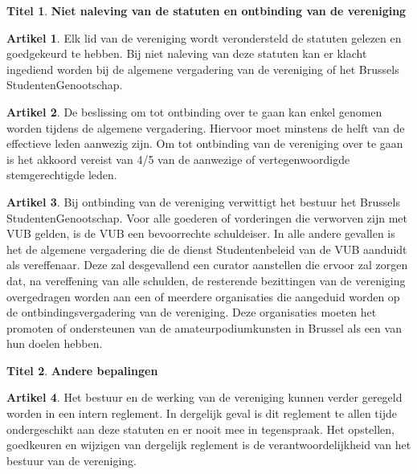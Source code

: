 \documentclass[a4paper,10pt]{article}
\theoremstyle{definition}
\newtheorem{titel}{\newline\Large Titel}
\newtheorem{artikelbase}{\large Artikel}
\newenvironment{artikel}
  {\begin{artikelbase}}
  {\smallskip
   \end{artikelbase}}
\newcommand{\ttext}[1]{\Large \textbf{#1} \normalsize}
\newcommand{\ttextcr}{\hfill\newline}
\begin{document}
\begin{titel}\ttext{Niet naleving van de statuten en ontbinding van de vereniging}

  \begin{artikel}\ttextcr
    Elk lid van de vereniging wordt verondersteld de statuten gelezen en goedgekeurd te hebben.
    Bij niet naleving van deze statuten kan er klacht ingediend worden bij de algemene vergadering van de vereniging of het Brussels StudentenGenootschap.
  \end{artikel}

  \begin{artikel}\label{ontbinding}\ttextcr
    De beslissing om tot ontbinding over te gaan kan enkel genomen worden tijdens de algemene vergadering.
    Hiervoor moet minstens de helft van de effectieve leden aanwezig zijn.
    Om tot ontbinding van de vereniging over te gaan is het akkoord vereist van 4/5 van de aanwezige of vertegenwoordigde stemgerechtigde leden.
  \end{artikel}

  \begin{artikel}\ttextcr
    Bij ontbinding van de vereniging verwittigt het bestuur het Brussels StudentenGenootschap.
    Voor alle goederen of vorderingen die verworven zijn met VUB gelden, is de VUB een bevoorrechte schuldeiser.
    In alle andere gevallen is het de algemene vergadering die de dienst Studentenbeleid van de VUB aanduidt als vereffenaar.
    Deze zal desgevallend een curator aanstellen die ervoor zal zorgen dat, na vereffening van alle schulden, de resterende bezittingen van de vereniging overgedragen worden aan een of meerdere organisaties die aangeduid worden op de ontbindingsvergadering van de vereniging.
    Deze organisaties moeten het promoten of ondersteunen van de amateurpodiumkunsten in Brussel als een van hun doelen hebben.
  \end{artikel}

\end{titel}


\begin{titel}\ttext{Andere bepalingen}

  \begin{artikel}\label{varia-reglement}\ttextcr
    Het bestuur en de werking van de vereniging kunnen verder geregeld worden in een intern reglement.
    In dergelijk geval is dit reglement te allen tijde ondergeschikt aan deze statuten en er nooit mee in tegenspraak.
    Het opstellen, goedkeuren en wijzigen van dergelijk reglement is de verantwoordelijkheid van het bestuur van de vereniging.
  \end{artikel}

\end{titel}
\end{document}
